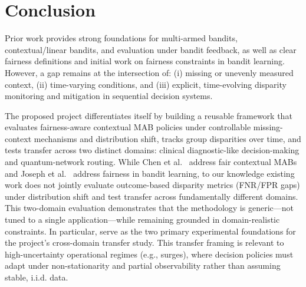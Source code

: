 \documentclass[conference]{IEEEtran}
\begin{document}
\section{Conclusion}
Prior work provides strong foundations for multi-armed bandits, contextual/linear bandits,
and evaluation under bandit feedback, as well as clear fairness definitions and initial work
on fairness constraints in bandit learning. However, a gap remains at the intersection of:
(i) missing or unevenly measured context, (ii) time-varying conditions, and (iii) explicit,
time-evolving disparity monitoring and mitigation in sequential decision systems.

The proposed project differentiates itself by building a reusable framework that evaluates
fairness-aware contextual MAB policies under controllable missing-context mechanisms and
distribution shift, tracks group disparities over time, and tests transfer across two distinct
domains: clinical diagnostic-like decision-making and quantum-network routing. While
Chen et al.~\cite{chen2020fair} address fair contextual MABs and Joseph et al.~\cite{joseph2016fairness}
address fairness in bandit learning, to our knowledge existing work does not jointly evaluate
outcome-based disparity metrics (FNR/FPR gaps) under distribution shift and test transfer
across fundamentally different domains. This two-domain evaluation demonstrates that the
methodology is generic---not tuned to a single application---while remaining grounded in
domain-realistic constraints.
In particular, \cite{garcia2025equitable_bioinformatics,garcia2026threat_aware_quantum_routing}
serve as the two primary experimental foundations for the project’s cross-domain transfer study.
This transfer framing is relevant to high-uncertainty operational regimes (e.g., surges), where
decision policies must adapt under non-stationarity and partial observability rather than assuming
stable, i.i.d. data.



\end{document}

